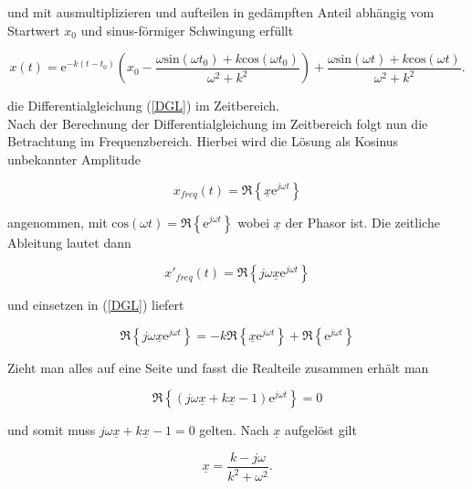 und mit ausmultiplizieren und aufteilen in gedämpften Anteil abhängig vom Startwert $x_0$ und sinus-förmiger Schwingung erfüllt

\begin{equation*}
	x(t) = \mathrm{e}^{-k(t-t_0)}\left(x_0-\frac{\omega \mathrm{sin}(\omega t_0)+k\mathrm{cos}(\omega t_0)}{\omega^2+k^2}\right)+\frac{\omega \mathrm{sin}(\omega t)+k\mathrm{cos}(\omega t)}{\omega^2+k^2}.
\end{equation*}

die Differentialgleichung (\ref{DGL}) im Zeitbereich.\\

Nach der Berechnung der Differentialgleichung im Zeitbereich folgt nun die Betrachtung im Frequenzbereich. Hierbei wird die Lösung als Kosinus unbekannter Amplitude

\begin{equation*}
	x_{freq} (t) = \Re \left\{\underline{x}\mathrm{e}^{j\omega t}\right\}
\end{equation*}

angenommen, mit $\mathrm{cos}(\omega t) = \Re\left\{\mathrm{e}^{j\omega t}\right\}$ wobei $\underline{x}$ der Phasor ist. Die zeitliche Ableitung lautet dann 

\begin{equation*}
	x'_{freq}(t) = \Re \left\{j\omega \underline{x} \mathrm{e}^{j\omega t}\right\}
\end{equation*}

und einsetzen in (\ref{DGL}) liefert

\begin{equation*}
	\Re \left\{j\omega \underline{x} \mathrm{e}^{j\omega t}\right\} = -k\Re\left\{\underline{x}\mathrm{e}^{j\omega t}\right\} + \Re\left\{\mathrm{e}^{j\omega t}\right\}
\end{equation*}

Zieht man alles auf eine Seite und fasst die Realteile zusammen erhält man 

\begin{equation*}
	\Re \left\{(j\omega \underline{x} + k\underline{x} - 1)\mathrm{e}^{j\omega t}\right\} = 0
\end{equation*}

und somit muss $j\omega \underline{x} + k\underline{x} - 1 = 0$ gelten. Nach $\underline{x}$ aufgelöst gilt 

\begin{equation*}
	\underline{x} = \frac{k-j\omega}{k^2+\omega^2}.
\end{equation*}

